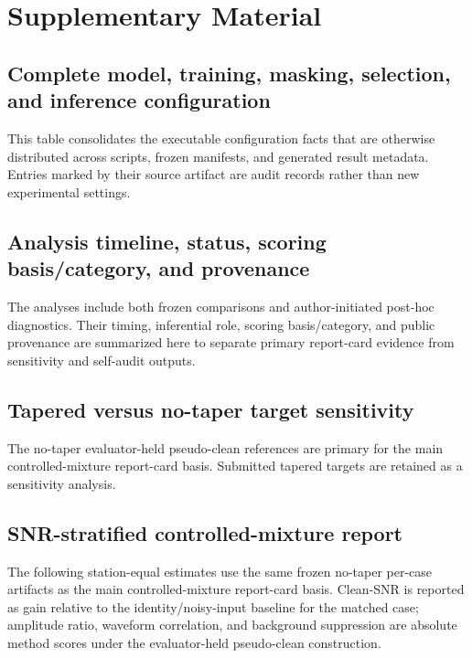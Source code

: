 \documentclass[12pt]{article}
\begin{document}
\section*{Supplementary Material}

\subsection*{Complete model, training, masking, selection, and inference configuration}
This table consolidates the executable configuration facts that are otherwise distributed across scripts, frozen manifests, and generated result metadata. Entries marked by their source artifact are audit records rather than new experimental settings.

{\scriptsize

}

\subsection*{Analysis timeline, status, scoring basis/category, and provenance}
The analyses include both frozen comparisons and author-initiated post-hoc diagnostics. Their timing, inferential role, scoring basis/category, and public provenance are summarized here to separate primary report-card evidence from sensitivity and self-audit outputs.

{\scriptsize

}

\subsection*{Tapered versus no-taper target sensitivity}
The no-taper evaluator-held pseudo-clean references are primary for the main controlled-mixture report-card basis. Submitted tapered targets are retained as a sensitivity analysis.

\subsection*{SNR-stratified controlled-mixture report}
The following station-equal estimates use the same frozen no-taper per-case artifacts as the main controlled-mixture report-card basis. Clean-SNR is reported as gain relative to the identity/noisy-input baseline for the matched case; amplitude ratio, waveform correlation, and background suppression are absolute method scores under the evaluator-held pseudo-clean construction.
\end{document}
